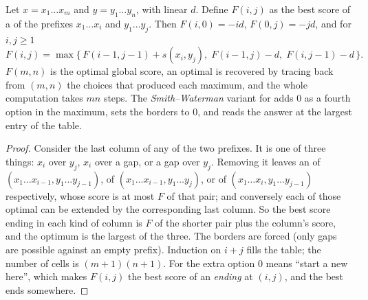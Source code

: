 \begin{theorem}\label{thm:b3:bioinformatics:nw}
Let $x = x_{1}\dots x_{m}$ and $y = y_{1}\dots y_{n}$, with linear  $d$. Define $F(i,j)$ as the best score of a 
of the prefixes $x_{1}\dots x_{i}$ and $y_{1}\dots y_{j}$. Then
$F(i,0) = -id$, $F(0,j) = -jd$, and for $i,j \ge 1$
\[
F(i,j) = \max\bigl\{\,F(i-1,j-1) + s(x_{i},y_{j}),\;
F(i-1,j) - d,\; F(i,j-1) - d\,\bigr\}.
\]
$F(m,n)$ is the optimal global score, an optimal  is recovered
by tracing back from $(m,n)$ the choices that produced each maximum,
and the whole computation takes $mn$ steps. The \emph{Smith--Waterman}
variant for  adds $0$ as a fourth option in the maximum,
sets the borders to $0$, and reads the answer at the largest entry of
the table.
\end{theorem}
\begin{proof}
Consider the last column of any  of the two prefixes. It is
one of three things: $x_{i}$ over $y_{j}$, $x_{i}$ over a gap, or a gap
over $y_{j}$. Removing it leaves an  of $(x_{1}\dots x_{i-1},
y_{1}\dots y_{j-1})$, of $(x_{1}\dots x_{i-1}, y_{1}\dots y_{j})$, or of
$(x_{1}\dots x_{i}, y_{1}\dots y_{j-1})$ respectively, whose score is at
most $F$ of that pair; and conversely each of those optimal 
can be extended by the corresponding last column. So the best score
ending in each kind of column is $F$ of the shorter pair plus the
column's score, and the optimum is the largest of the three. The
borders are forced (only gaps are possible against an empty prefix).
Induction on $i + j$ fills the table; the number of cells is $(m+1)(n+1)$.
For  the extra option $0$ means ``start a new 
here'', which makes $F(i,j)$ the best score of an  \emph{ending}
at $(i,j)$, and the best  ends somewhere.
\end{proof}

